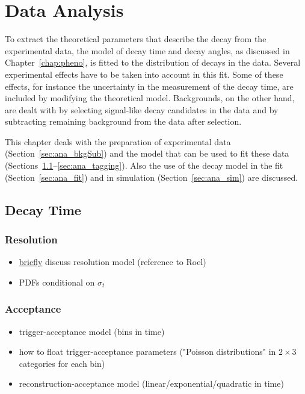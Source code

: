 \chapter{Data Analysis}
\label{chap:ana}


To extract the theoretical parameters that describe the \BstoJpsiKK{} decay from the experimental data, the model of decay time and decay
angles, as discussed in Chapter~\ref{chap:pheno}, is fitted to the distribution of decays in the data. Several experimental effects have to
be taken into account in this fit. Some of these effects, for instance the uncertainty in the measurement of the decay time, are included
by modifying the theoretical model. Backgrounds, on the other hand, are dealt with by selecting signal-like decay candidates in the data
and by subtracting remaining background from the data after selection.

This chapter deals with the preparation of experimental data (Section~\ref{sec:ana_bkgSub}) and the model that can be used to fit these
data (Sections~\ref{sec:ana_time}--\ref{sec:ana_tagging}). Also the use of the decay model in the fit (Section~\ref{sec:ana_fit}) and in
simulation (Section~\ref{sec:ana_sim}) are discussed.




\section{Decay Time}
\label{sec:ana_time}

\subsection{Resolution}
\label{subsec:ana_time_res}
\begin{itemize}
  \item \underline{briefly} discuss resolution model (reference to Roel)
  \item PDFs conditional on $\sigma_t$
\end{itemize}

\subsection{Acceptance}
\label{subsec:ana_time_acc}
\begin{itemize}
  \item trigger-acceptance model (bins in time)
  \item how to float trigger-acceptance parameters ("Poisson distributions" in $2\times3$ categories for each bin)
  \item reconstruction-acceptance model (linear/exponential/quadratic in time)
\end{itemize}

